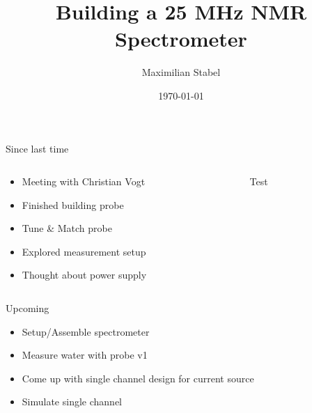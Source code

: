 \documentclass{ethpresentation}
\title{Building a 25 MHz NMR Spectrometer}
\date{\today}
\author{Maximilian Stabel}
\institute{ETH Zürich}
\begin{document}
\maketitle
\begin{frame}{Since last time}
  \begin{columns}
    \begin{column}{0.45\textwidth}
      \begin{itemize}
        \item Meeting with Christian Vogt
        \item Finished building probe
        \item Tune \& Match probe
        \item Explored measurement setup
        \item Thought about power supply
      \end{itemize}
    \end{column}
    \begin{column}{0.45\textwidth}
      Test
    \end{column}
  \end{columns}
\end{frame}
\begin{frame}{Upcoming}
  \begin{itemize}
    \item Setup/Assemble spectrometer
    \item Measure water with probe v1
    \item Come up with single channel design for current source
    \item Simulate single channel
  \end{itemize}
\end{frame}


\end{document}

